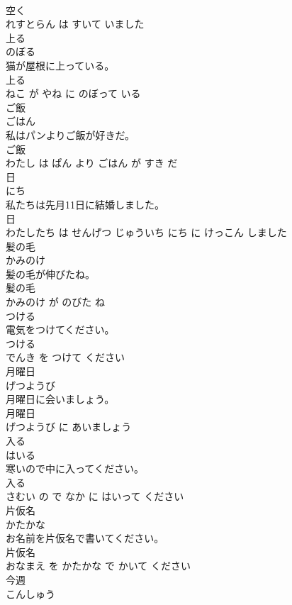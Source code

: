 \documentclass[8pt]{extreport}
\begin{document}
\begin{CJK}{UTF8}{min}
\\	空く 
\\	れすとらん は すいて いました			
\\	上る	
\\	のぼる			
\\	猫が屋根に上っている。	
\\	上る 
\\	ねこ が やね に のぼって いる			
\\	ご飯	
\\	ごはん			
\\	私はパンよりご飯が好きだ。	
\\	ご飯 
\\	わたし は ぱん より ごはん が すき だ			
\\	日	
\\	にち			
\\	私たちは先月11日に結婚しました。	
\\	日 
\\	わたしたち は せんげつ じゅういち にち に けっこん しました			
\\	髪の毛	
\\	かみのけ			
\\	髪の毛が伸びたね。	
\\	髪の毛 
\\	かみのけ が のびた ね			
\\	つける	
\\	電気をつけてください。	
\\	つける 
\\	でんき を つけて ください			
\\	月曜日	
\\	げつようび			
\\	月曜日に会いましょう。	
\\	月曜日 
\\	げつようび に あいましょう			
\\	入る	
\\	はいる			
\\	寒いので中に入ってください。	
\\	入る 
\\	さむい の で なか に はいって ください			
\\	片仮名	
\\	かたかな			
\\	お名前を片仮名で書いてください。	
\\	片仮名 
\\	おなまえ を かたかな で かいて ください			
\\	今週	
\\	こんしゅう			

\end{CJK}
\end{document}
